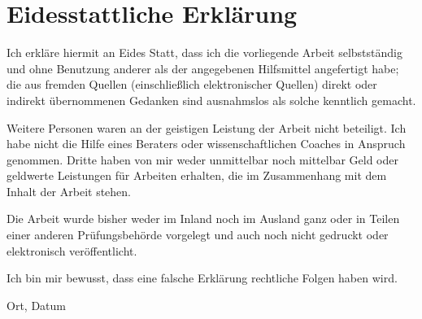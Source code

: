 \pagestyle{empty}
\section*{Eidesstattliche Erklärung}

Ich erkläre hiermit an Eides Statt, dass ich die vorliegende Arbeit selbstständig und ohne Benutzung anderer als der angegebenen Hilfsmittel angefertigt habe; die aus fremden Quellen (einschließlich elektronischer Quellen) direkt oder indirekt übernommenen Gedanken sind ausnahmslos als solche kenntlich gemacht.



Weitere Personen waren an der geistigen Leistung der Arbeit nicht beteiligt. Ich habe nicht die Hilfe eines Beraters oder wissenschaftlichen Coaches in Anspruch genommen. Dritte haben von mir weder unmittelbar noch mittelbar Geld oder geldwerte Leistungen für Arbeiten erhalten, die im Zusammenhang mit dem Inhalt der Arbeit stehen.

Die Arbeit wurde bisher weder im Inland noch im Ausland ganz oder in Teilen einer anderen Prüfungsbehörde vorgelegt und auch noch nicht gedruckt oder elektronisch veröffentlicht.

Ich bin mir bewusst, dass eine falsche Erklärung rechtliche Folgen haben wird.

\vspace{1.0cm}

\begingroup
\raggedright{\underline{\hspace{5.0cm}}}
\hfill
\raggedleft{\underline{\hspace{5.0cm}}}
\endgroup

\vspace{-0.3cm}

\begingroup
\raggedright{Ort, Datum}
\hfill
{}
\endgroup